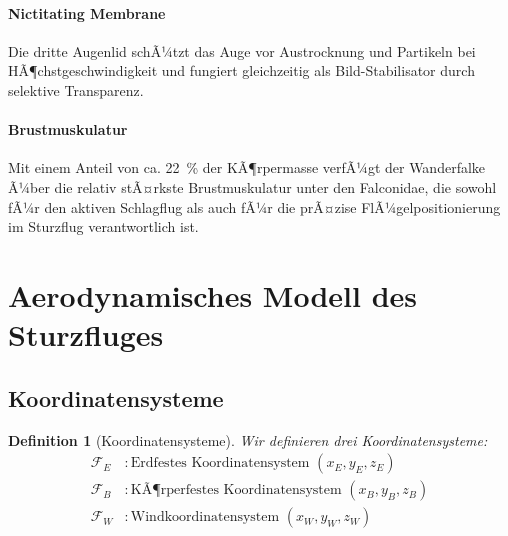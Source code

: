 ﻿\documentclass[12pt,a4paper]{article}
\newtheorem{definition}{Definition}[section]
\theoremstyle{remark}
\begin{document}
	\paragraph{Nictitating Membrane} Die dritte Augenlid schÃ¼tzt das Auge vor Austrocknung und Partikeln bei HÃ¶chstgeschwindigkeit und fungiert gleichzeitig als Bild-Stabilisator durch selektive Transparenz.
	
	\paragraph{Brustmuskulatur} Mit einem Anteil von ca. \SI{22}{\percent} der KÃ¶rpermasse verfÃ¼gt der Wanderfalke Ã¼ber die relativ stÃ¤rkste Brustmuskulatur unter den Falconidae, die sowohl fÃ¼r den aktiven Schlagflug als auch fÃ¼r die prÃ¤zise FlÃ¼gelpositionierung im Sturzflug verantwortlich ist.
	
	\section{Aerodynamisches Modell des Sturzfluges}
	\label{sec:aerodynamik}
	
	\subsection{Koordinatensysteme}
	
	\begin{definition}[Koordinatensysteme]
		Wir definieren drei Koordinatensysteme:
		\begin{align}
			\mathcal{F}_E &: \text{Erdfestes Koordinatensystem } (x_E, y_E, z_E) \\
			\mathcal{F}_B &: \text{KÃ¶rperfestes Koordinatensystem } (x_B, y_B, z_B) \\
			\mathcal{F}_W &: \text{Windkoordinatensystem } (x_W, y_W, z_W)
		\end{align}
	\end{definition}
	
\end{document}

